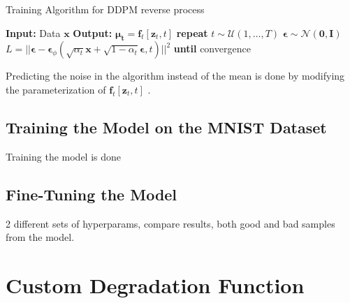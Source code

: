 \documentclass[12pt]{report} %
\begin{document}
\begin{definitionbox}{Training Algorithm for DDPM reverse process \cite{ho2020denoising}}
  \begin{algorithmic}
    \State \textbf{Input:} Data $\mathbf{x}$
    \State \textbf{Output:} $\mathbf{\mu_{t}} = \mathbf{f}_{t}[\mathbf{z}_{t},t]$
    \State \textbf{repeat}
       
        \State $t \sim \mathcal{U}(1, \dots, T)$ 
        \State $\mathbf{\epsilon} \sim \mathcal{N}(\mathbf{0}, \mathbf{I})$ 
        \State $L = ||\mathbf{\epsilon} - \mathbf{\epsilon}_{\phi}(\sqrt{\alpha_{t}}\mathbf{x} + \sqrt{1 - \alpha_{t}}\mathbf{\epsilon}, t)||^{2}$ 
      \EndFor {}
    \State \textbf{until} convergence
  \end{algorithmic}
\end{definitionbox}

Predicting the noise in the algorithm instead of the mean is done by modifying the parameterization of $\mathbf{f}_{t}[\mathbf{z}_{t}, t]$ \cite{ho2020denoising}.

\section{Training the Model on the MNIST Dataset}

Training the model is done

\section{Fine-Tuning the Model}

2 different sets of hyperparams, compare results, both good and bad samples from the model.





\chapter{Custom Degradation Function}
\end{document}
